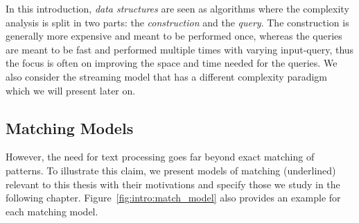 In this introduction, \emph{data structures} are seen as algorithms where the complexity analysis is split in two parts: the \emph{construction} and the \emph{query}. The construction is generally more expensive and meant to be performed once, whereas the queries are meant to be fast and performed multiple times with varying input-query, thus the focus is often on improving the space and time needed for the queries. We also consider the streaming model that has a different complexity paradigm which we will present later on.


\subsection{Matching Models}\label{sec:intro:complex}



However, the need for text processing goes far beyond exact matching of patterns. To illustrate this claim, we present models of matching (underlined) relevant to this thesis with their motivations and specify those we study in the following chapter. Figure~\ref{fig:intro:match_model} also provides an example for each matching model.

